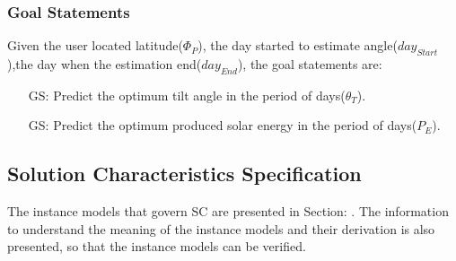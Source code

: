 \documentclass[12pt]{article}
\newcounter{goalnum} %
\begin{document}
\subsubsection{Goal Statements} \label{sec_GS}

\noindent Given the user located latitude($\Phi_{P}$), the day started to estimate angle($day_{Start}$),the day when the  estimation end($day_{End}$), the goal statements are:

\begin{itemize}

\item[GS\refstepcounter{goalnum}\thegoalnum \label{G_meaningfulLabel}:] Predict the optimum tilt angle in the period of days($\theta_{T}$).

\item[GS\refstepcounter{goalnum}\thegoalnum \label{G_meaningfulLabel}:] Predict the optimum produced solar energy in the period of days($P_{E}$).


\end{itemize}

\subsection{Solution Characteristics Specification} \label{sec_SCS}

The instance models that govern SC are presented in Section: . The
information to understand the meaning of the instance models and their derivation is also
presented, so that the instance models can be verified.


\iffalse{}
\end{document}
